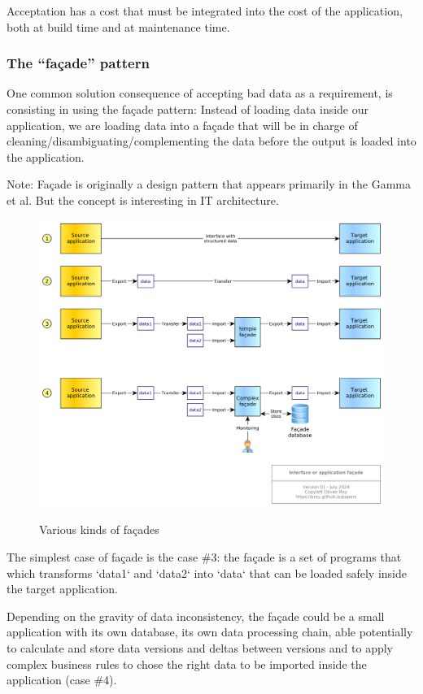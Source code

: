 \documentclass[]{article}
\begin{document}
Acceptation has a cost that must be integrated into the cost of the application, both at build time and at maintenance time.

\subsubsection{The ``façade'' pattern}

One common solution consequence of accepting bad data as a requirement, is consisting in using the façade pattern: Instead of loading data inside our application, we are loading data into a façade that will be in charge of cleaning/disambiguating/complementing the data before the output is loaded into the application.

Note: Façade is originally a design pattern that appears primarily in the Gamma et al. But the concept is interesting in IT architecture.

\begin{figure}[t]
\caption{Various kinds of façades}
\includegraphics[width=\textwidth]{app-facade.png}
\label{fig:facade}
\end{figure}

The simplest case of façade is the case \#3: the façade is a set of programs that which transforms `data1` and `data2` into `data` that can be loaded safely inside the target application.

Depending on the gravity of data inconsistency, the façade could be a small application with its own database, its own data processing chain, able potentially to calculate and store data versions and deltas between versions and to apply complex business rules to chose the right data to be imported inside the application (case \#4).
\end{document}
